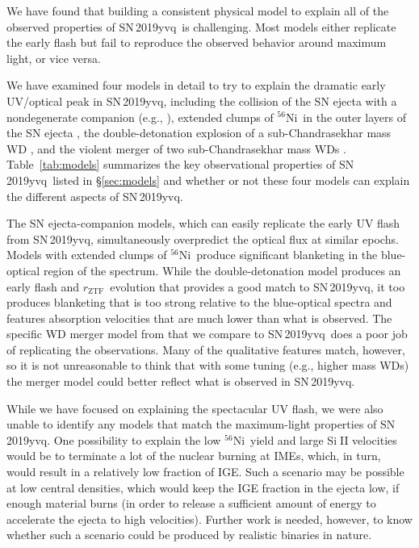 \documentclass[twocolumn]{aastex63}
\def\ion#1#2{#1$\;${\footnotesize\rm{#2}}\relax}
\newcommand{\rztf}{$r_\mathrm{ZTF}$}
\newcommand{\radni}{$^{56}$Ni}
\newcommand{\sn}{SN\,2019yvq}
\begin{document}
We have found that building a consistent physical model to explain all of the
observed properties of \sn\ is challenging. Most models either replicate the
early flash but fail to reproduce the observed behavior around maximum light,
or vice versa.

We have examined four models in detail to try to explain the dramatic early
UV/optical peak in \sn, including the collision of the SN ejecta with a
nondegenerate companion (e.g., \citealt{Kasen10a}), extended clumps of \radni\
in the outer layers of the SN ejecta \citep[e.g.,][]{Magee20a}, the
double-detonation explosion of a sub-Chandrasekhar mass WD
\citep[e.g.,][]{Polin19}, and the violent merger of two sub-Chandrasekhar mass
WDs \citep[e.g.,][]{Kromer16}. Table~\ref{tab:models} summarizes the
key observational properties of \sn\ listed in \S\ref{sec:models} and whether
or not these four models can explain the different aspects of \sn.

The SN ejecta-companion models, which can easily replicate the early UV flash
from \sn, simultaneously overpredict the optical flux at similar epochs.
Models with extended clumps of \radni\ produce significant blanketing in the
blue-optical region of the spectrum. While the double-detonation model
produces an early flash and \rztf\ evolution that provides a good match to
\sn, it too produces blanketing that is too strong relative to the
blue-optical spectra and features absorption velocities that are much lower
than what is observed. The specific WD merger model from \citet{Kromer16} that
we compare to \sn\ does a poor job of replicating the observations. Many of
the qualitative features match, however, so it is not unreasonable to think
that with some tuning (e.g., higher mass WDs) the merger model could better
reflect what is observed in \sn.

While we have focused on explaining the spectacular UV flash, we were also
unable to identify any models that match the maximum-light properties of \sn.
One possibility to explain the low \radni\ yield and large \ion{Si}{II}
velocities would be to terminate a lot of the nuclear burning at IMEs, which,
in turn, would result in a relatively low fraction of IGE. Such a scenario may
be possible at low central densities, which would keep the IGE fraction in the
ejecta low, if enough material burns (in order to release a sufficient amount
of energy to accelerate the ejecta to high velocities). Further work is
needed, however, to know whether such a scenario could be produced by
realistic binaries in nature.
\end{document}
